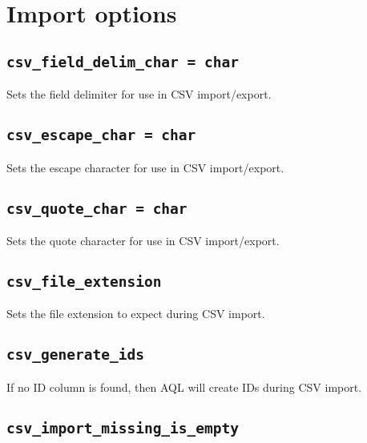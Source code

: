 \documentclass[10pt]{book}
\begin{document}
\section{Import options}
%

\subsection{{\tt csv\_field\_delim\_char = char}}
Sets the field delimiter for use in CSV import/export.

\subsection{{\tt csv\_escape\_char = char}}
Sets the escape character for use in CSV import/export.

\subsection{{\tt csv\_quote\_char = char}}
Sets the quote character for use in CSV import/export.

\subsection{{\tt csv\_file\_extension}}
Sets the file extension to expect during CSV import.

\subsection{{\tt csv\_generate\_ids}}
If no ID column is found, then AQL will create IDs during CSV import.

\subsection{{\tt csv\_import\_missing\_is\_empty}}
\end{document}
